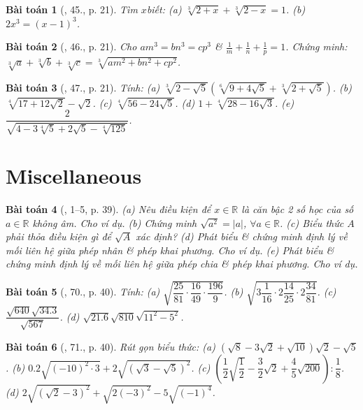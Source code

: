 \documentclass{article}
\newtheorem{baitoan}{Bài toán}
\begin{document}
\begin{baitoan}[\cite{Binh_Toan_9_tap_1}, 45., p. 21]
	Tìm $x$biết: (a) $\sqrt[3]{2 + x} + \sqrt[3]{2 - x} = 1$. (b) $2x^3 = (x - 1)^3$.
\end{baitoan}

\begin{baitoan}[\cite{Binh_Toan_9_tap_1}, 46., p. 21]
	Cho $am^3 = bn^3 = cp^3$ \& $\frac{1}{m} + \frac{1}{n} + \frac{1}{p} = 1$. Chứng minh: $\sqrt[3]{a} + \sqrt[3]{b} + \sqrt[3]{c} = \sqrt[3]{am^2 + bn^2 + cp^2}$.
\end{baitoan}

\begin{baitoan}[\cite{Binh_Toan_9_tap_1}, 47., p. 21]
	 Tính: (a) $\sqrt[3]{2 - \sqrt{5}}(\sqrt[6]{9 + 4\sqrt{5}} + \sqrt[3]{2 + \sqrt{5}})$. (b) $\sqrt[4]{17 + 12\sqrt{2}} - \sqrt{2}$. (c) $\sqrt[4]{56 - 24\sqrt{5}}$. (d) $1 + \sqrt[4]{28 - 16\sqrt{3}}$. (e) $\dfrac{2}{\sqrt{4 - 3\sqrt[4]{5} + 2\sqrt{5} - \sqrt[4]{125}}}$.
\end{baitoan}


\section{Miscellaneous}

\begin{baitoan}[\cite{SGK_Toan_9_tap_1}, 1--5, p. 39]
	(a) Nêu điều kiện để $x\in\mathbb{R}$ là căn bậc 2 số học của số $a\in\mathbb{R}$ không âm. Cho ví dụ. (b) Chứng minh $\sqrt{a^2} = |a|$, $\forall a\in\mathbb{R}$. (c) Biểu thức $A$ phải thỏa điều kiện gì để $\sqrt{A}$ xác định? (d) Phát biểu \& chứng minh định lý về mối liên hệ giữa phép nhân \& phép khai phương. Cho ví dụ. (e) Phát biểu \& chứng minh định lý về mối liên hệ giữa phép chia \& phép khai phương. Cho ví dụ.
\end{baitoan}

\begin{baitoan}[\cite{SGK_Toan_9_tap_1}, 70., p. 40]
	Tính: (a) $\sqrt{\dfrac{25}{81}\cdot\dfrac{16}{49}\cdot\dfrac{196}{9}}$. (b) $\sqrt{3\dfrac{1}{16}\cdot2\dfrac{14}{25}\cdot2\dfrac{34}{81}}$. (c) $\dfrac{\sqrt{640}\sqrt{34.3}}{\sqrt{567}}$. (d) $\sqrt{21.6}\sqrt{810}\sqrt{11^2 - 5^2}$.
\end{baitoan}

\begin{baitoan}[\cite{SGK_Toan_9_tap_1}, 71., p. 40]
	Rút gọn biểu thức: (a) $(\sqrt{8} - 3\sqrt{2} + \sqrt{10})\sqrt{2} - \sqrt{5}$. (b) $0.2\sqrt{(-10)^2\cdot3} + 2\sqrt{(\sqrt{3} - \sqrt{5})^2}$. (c) $\left(\dfrac{1}{2}\sqrt{\dfrac{1}{2}} - \dfrac{3}{2}\sqrt{2} + \dfrac{4}{5}\sqrt{200}\right):\dfrac{1}{8}$. (d) $2\sqrt{(\sqrt{2} - 3)^2} + \sqrt{2(-3)^2} - 5\sqrt{(-1)^4}$.
\end{baitoan}
\end{document}
